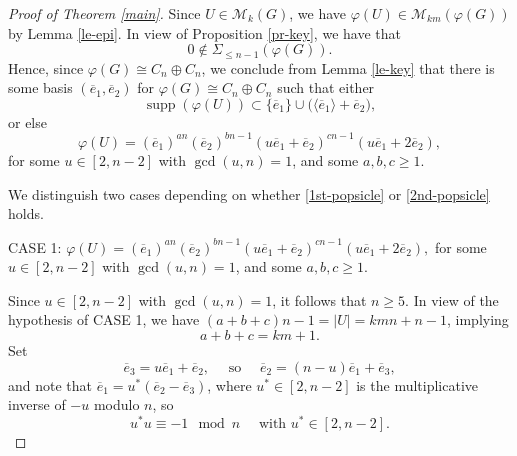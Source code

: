 \documentclass[11pt]{amsart}
\theoremstyle{definition}
\DeclareMathOperator{\supp}{supp}
\newcommand{\la}{\langle}
\newcommand{\ra}{\rangle}
\newcommand{\be}{\begin{equation}}
\newcommand{\ee}{\end{equation}}
\numberwithin{equation}{section}
\begin{document}
\begin{proof}[Proof of Theorem \ref{main}]
	
	  Since $U\in \mathcal M_k(G)$, we have  $\varphi(U)\in \mathcal M_{km}(\varphi(G))$ by Lemma \ref{le-epi}.
	 In view of Proposition \ref{pr-key}, we have that
	\be\label{notn-1} 0\notin \Sigma_{\leq n-1}(\varphi(G)).\ee
	Hence, since $\varphi(G)\cong C_n\oplus C_n$, we conclude from Lemma \ref{le-key} that there is some basis $(\overline e_1,\overline e_2)$ for $\varphi(G)\cong C_n\oplus C_n$ such that either
	\be\label{1st-popsicle} \supp(\varphi(U))\subset \{\overline e_1\}\cup\big(\la \overline e_1\ra+\overline e_2\big),\ee or else
	\be\label{2nd-popsicle} \varphi(U)=(\overline e_1)^{an} (\overline e_2)^{bn-1} (u\overline e_1+\overline e_2)^{cn-1} (u\overline e_1+2\overline e_2),\ee for some $u\in [2,n-2]$ with $\gcd(u,n)=1$, and some $a,b,c\geq 1$.
	
	
  We distinguish two cases depending on whether \eqref{1st-popsicle} or \eqref{2nd-popsicle} holds.
	
	

	
	
	
	\smallskip
	\noindent
	CASE 1: $\varphi(U)=(\overline e_1)^{an} (\overline e_2)^{bn-1} (u\overline e_1+\overline e_2)^{cn-1} (u\overline e_1+2\overline e_2),$ for some $u\in [2,n-2]$ with $\gcd(u,n)=1$, and some $a,b,c\geq 1$.
	
	
	Since $u\in [2,n-2]$ with $\gcd(u,n)=1$, it follows that   $n\geq 5$.
	In view of the hypothesis of CASE 1, we have  $(a+b+c)n-1=|U|=kmn+n-1$, implying \be\label{abcs}a+b+c=km+1.\ee Set $$\overline e_3=u\overline e_1+\overline e_2, \quad\mbox{ so } \quad \overline e_2=(n-u)\overline e_1+\overline e_3,$$
	and note that $\overline e_1=u^*(\overline e_2-\overline e_3)$, where $u^*\in [2,n-2]$ is the multiplicative inverse of $-u$ modulo $n$, so $$u^*u\equiv -1\mod n \quad\mbox{ with $u^*\in [2,n-2]$}.$$
	
	
	

\end{proof}
\end{document}
